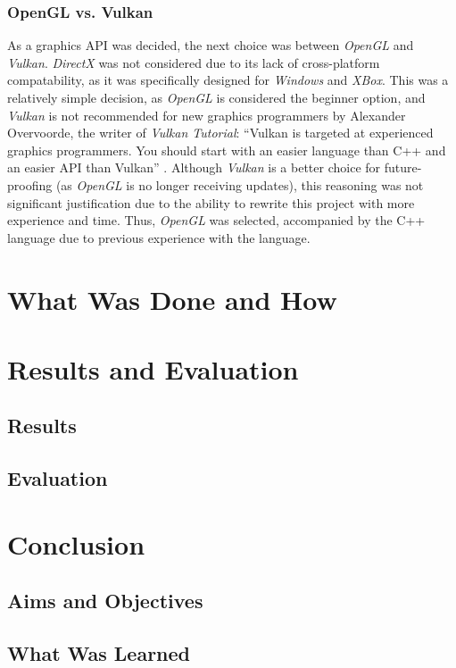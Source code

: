\documentclass[12pt]{article}
\begin{document}
    \subsubsection{OpenGL vs. Vulkan}

    As a graphics API was decided, the next choice was between \textit{OpenGL} and \textit{Vulkan}. \textit{DirectX} was not considered due to its lack of cross-platform compatability, as it was specifically designed for \textit{Windows} and \textit{XBox}. This was a relatively simple decision, as \textit{OpenGL} is considered the beginner option, and \textit{Vulkan} is not recommended for new graphics programmers by Alexander Overvoorde, the writer of \textit{Vulkan Tutorial}: ``Vulkan is targeted at experienced graphics programmers. You should start with an easier language than C++ and an easier API than Vulkan'' \cite{vulkancomment}. Although \textit{Vulkan} is a better choice for future-proofing (as \textit{OpenGL} is no longer receiving updates), this reasoning was not significant justification due to the ability to rewrite this project with more experience and time. Thus, \textit{OpenGL} was selected, accompanied by the C++ language due to previous experience with the language.
    
    \section{What Was Done and How}

    \section{Results and Evaluation}
    \subsection{Results}
    \subsection{Evaluation}

    \section{Conclusion}
    \subsection{Aims and Objectives}
    \subsection{What Was Learned}
\end{document}
